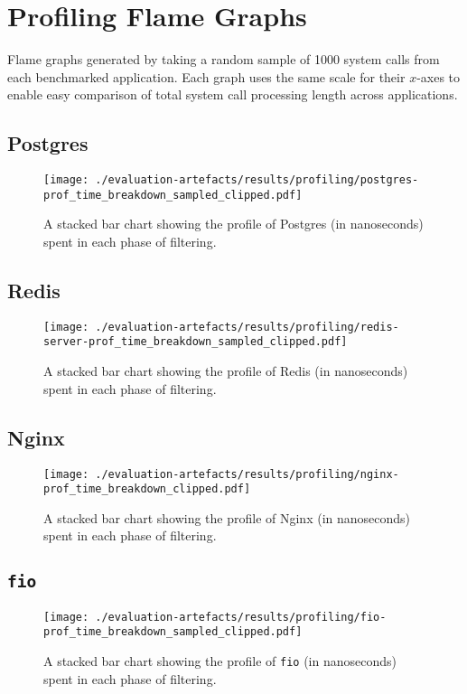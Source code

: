 \clearpage
\section{Profiling Flame Graphs}\label{apx:flame-graphs}

Flame graphs generated by taking a random sample of 1000 system calls from each
benchmarked application. Each graph uses the same scale for their $x$-axes to
enable easy comparison of total system call processing length across
applications.

\subsection{Postgres}
\begin{figure}[H]
    \centering
    \texttt{[image: ./evaluation-artefacts/results/profiling/postgres-prof\_time\_breakdown\_sampled\_clipped.pdf]}
    \caption{A stacked bar chart showing the profile of Postgres (in nanoseconds) \af
    spent in each phase of filtering.}
    \label{fig:postgres-profile}
\end{figure}


\subsection{Redis}
\begin{figure}[H]
    \centering
    \texttt{[image: ./evaluation-artefacts/results/profiling/redis-server-prof\_time\_breakdown\_sampled\_clipped.pdf]}
    \caption{A stacked bar chart showing the profile of Redis (in nanoseconds) \af
    spent in each phase of filtering.}
    \label{fig:redis-profile}
\end{figure}


\subsection{Nginx}
\begin{figure}[H]
    \centering
    \texttt{[image: ./evaluation-artefacts/results/profiling/nginx-prof\_time\_breakdown\_clipped.pdf]}
    \caption{A stacked bar chart showing the profile of Nginx (in nanoseconds) \af
    spent in each phase of filtering.}
    \label{fig:nginx-profile}
\end{figure}

\subsection{\texttt{fio}}
\begin{figure}[H]
    \centering
    \texttt{[image: ./evaluation-artefacts/results/profiling/fio-prof\_time\_breakdown\_sampled\_clipped.pdf]}
    \caption{A stacked bar chart showing the profile of \texttt{fio} (in nanoseconds) \af
    spent in each phase of filtering.}
    \label{fig:fio-profile}
\end{figure}

